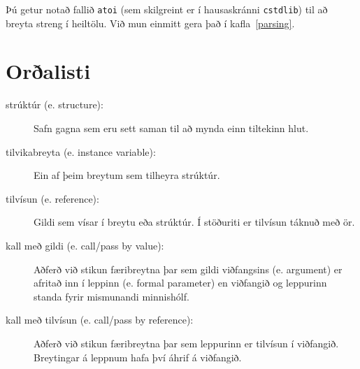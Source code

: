 Þú getur notað fallið {\tt atoi} (sem skilgreint er í hausaskránni {\tt cstdlib}) til að breyta streng í heiltölu. 
Við mun einmitt gera það í kafla~\ref{parsing}.

\section{Orðalisti}

\begin{description}

\item[strúktúr (e. structure):]  Safn gagna sem eru sett saman til að mynda einn tiltekinn hlut.

\item[tilvikabreyta (e. instance variable):]  Ein af þeim breytum sem tilheyra strúktúr.

\item[tilvísun (e. reference):]  Gildi sem vísar í breytu eða strúktúr. Í stöðuriti er tilvísun táknuð með ör.

\item[kall með gildi (e. call/pass by value):]  Aðferð við stikun færibreytna þar sem gildi viðfangsins (e. argument) er afritað inn í leppinn (e. formal parameter) en viðfangið og leppurinn standa fyrir mismunandi minnishólf.

\item[kall með tilvísun (e. call/pass by reference):]  Aðferð við stikun færibreytna þar sem leppurinn er tilvísun í viðfangið.
Breytingar á leppnum hafa því áhrif á viðfangið.


\end{description}

